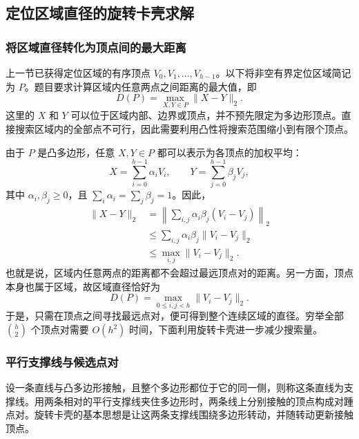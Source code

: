 \subsection{定位区域直径的旋转卡壳求解}
\label{sec:p1-calipers}

\subsubsection{将区域直径转化为顶点间的最大距离}

上一节已获得定位区域的有序顶点 $V_0,V_1,\ldots,V_{h-1}$。以下将非空有界定位区域简记为 $P$。题目要求计算区域内任意两点之间距离的最大值，即
\begin{equation}
    D(P)=\max_{X,Y\in P}\|X-Y\|_2.
\end{equation}
这里的 $X$ 和 $Y$ 可以位于区域内部、边界或顶点，并不预先限定为多边形顶点。直接搜索区域内的全部点不可行，因此需要利用凸性将搜索范围缩小到有限个顶点。

由于 $P$ 是凸多边形，任意 $X,Y\in P$ 都可以表示为各顶点的加权平均：
\begin{equation}
    X=\sum_{i=0}^{h-1}\alpha_iV_i,\qquad
    Y=\sum_{j=0}^{h-1}\beta_jV_j,
\end{equation}
其中 $\alpha_i,\beta_j\ge0$，且 $\sum_i\alpha_i=\sum_j\beta_j=1$。因此，
\begin{equation}
\begin{aligned}
    \|X-Y\|_2
    &=\left\|\sum_{i,j}\alpha_i\beta_j(V_i-V_j)\right\|_2\\
    &\le\sum_{i,j}\alpha_i\beta_j\|V_i-V_j\|_2\\
    &\le\max_{i,j}\|V_i-V_j\|_2.
\end{aligned}
\end{equation}
也就是说，区域内任意两点的距离都不会超过最远顶点对的距离。另一方面，顶点本身也属于区域，故区域直径恰好为
\begin{equation}\label{eq:p1-vertexdiam}
    D(P)=\max_{0\le i,j<h}\|V_i-V_j\|_2.
\end{equation}
于是，只需在顶点之间寻找最远点对，便可得到整个连续区域的直径。穷举全部 $\binom h2$ 个顶点对需要 $O(h^2)$ 时间，下面利用旋转卡壳进一步减少搜索量。

\subsubsection{平行支撑线与候选点对}

设一条直线与凸多边形接触，且整个多边形都位于它的同一侧，则称这条直线为支撑线。用两条相对的平行支撑线夹住多边形时，两条线上分别接触的顶点构成对踵点对。旋转卡壳的基本思想是让这两条支撑线围绕多边形转动，并随转动更新接触顶点\cite{p1-toussaint1983}。

